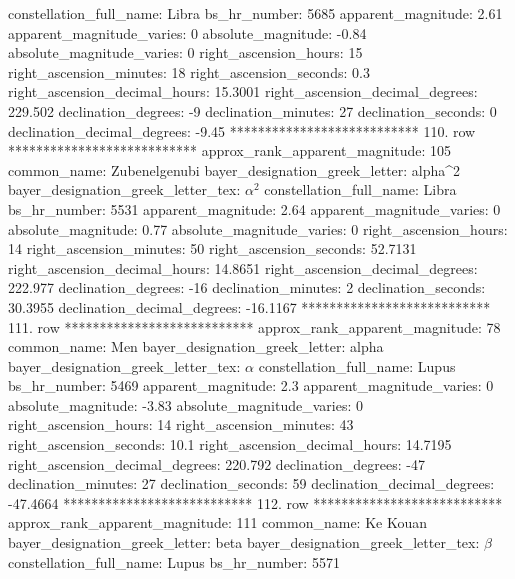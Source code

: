            constellation_full_name: Libra
                      bs_hr_number: 5685
                apparent_magnitude: 2.61
         apparent_magnitude_varies: 0
                absolute_magnitude: -0.84
         absolute_magnitude_varies: 0
             right_ascension_hours: 15
           right_ascension_minutes: 18
           right_ascension_seconds: 0.3
     right_ascension_decimal_hours: 15.3001
   right_ascension_decimal_degrees: 229.502
               declination_degrees: -9
               declination_minutes: 27
               declination_seconds: 0
       declination_decimal_degrees: -9.45
*************************** 110. row ***************************
    approx_rank_apparent_magnitude: 105
                       common_name: Zubenelgenubi
    bayer_designation_greek_letter: alpha^2
bayer_designation_greek_letter_tex: $\alpha^2$
           constellation_full_name: Libra
                      bs_hr_number: 5531
                apparent_magnitude: 2.64
         apparent_magnitude_varies: 0
                absolute_magnitude: 0.77
         absolute_magnitude_varies: 0
             right_ascension_hours: 14
           right_ascension_minutes: 50
           right_ascension_seconds: 52.7131
     right_ascension_decimal_hours: 14.8651
   right_ascension_decimal_degrees: 222.977
               declination_degrees: -16
               declination_minutes: 2
               declination_seconds: 30.3955
       declination_decimal_degrees: -16.1167
*************************** 111. row ***************************
    approx_rank_apparent_magnitude: 78
                       common_name: Men
    bayer_designation_greek_letter: alpha
bayer_designation_greek_letter_tex: $\alpha$
           constellation_full_name: Lupus
                      bs_hr_number: 5469
                apparent_magnitude: 2.3
         apparent_magnitude_varies: 0
                absolute_magnitude: -3.83
         absolute_magnitude_varies: 0
             right_ascension_hours: 14
           right_ascension_minutes: 43
           right_ascension_seconds: 10.1
     right_ascension_decimal_hours: 14.7195
   right_ascension_decimal_degrees: 220.792
               declination_degrees: -47
               declination_minutes: 27
               declination_seconds: 59
       declination_decimal_degrees: -47.4664
*************************** 112. row ***************************
    approx_rank_apparent_magnitude: 111
                       common_name: Ke Kouan
    bayer_designation_greek_letter: beta
bayer_designation_greek_letter_tex: $\beta$
           constellation_full_name: Lupus
                      bs_hr_number: 5571
